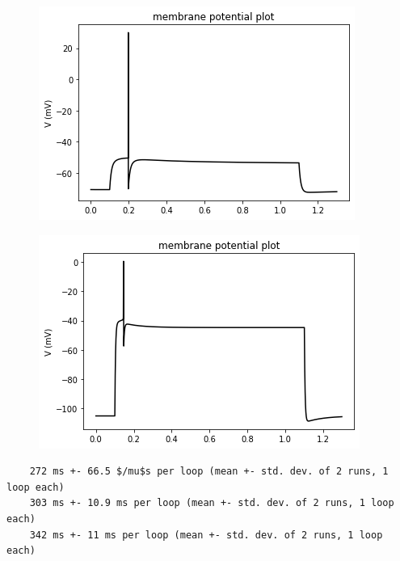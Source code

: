    \begin{center}
    \begin{figure}
    \includegraphics{figures/backend_check_files/backend_check_4_2.png}
    \end{figure}
    \end{center}

\begin{center}
\begin{figure}

    \includegraphics{figures/backend_check_files/backend_check_12_10.png}
\end{figure}

\end{center}
    
\begin{verbatim}
    272 ms +- 66.5 $/mu$s per loop (mean +- std. dev. of 2 runs, 1 loop each)
    303 ms +- 10.9 ms per loop (mean +- std. dev. of 2 runs, 1 loop each)
    342 ms +- 11 ms per loop (mean +- std. dev. of 2 runs, 1 loop each)
\end{verbatim}

